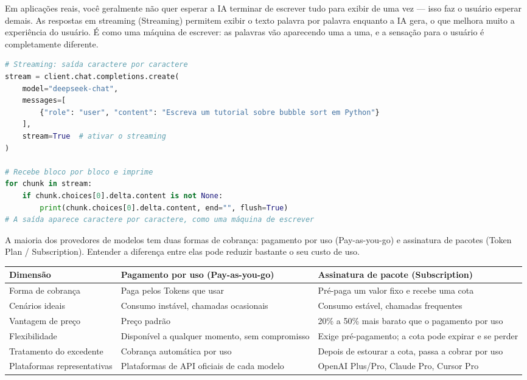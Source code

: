 
Em aplicações reais, você geralmente não quer esperar a IA terminar de escrever tudo para exibir de uma vez — isso faz o usuário esperar demais. As respostas em streaming (Streaming) permitem exibir o texto palavra por palavra enquanto a IA gera, o que melhora muito a experiência do usuário. É como uma máquina de escrever: as palavras vão aparecendo uma a uma, e a sensação para o usuário é completamente diferente.

\begin{lstlisting}[language=Python]
# Streaming: saída caractere por caractere
stream = client.chat.completions.create(
    model="deepseek-chat",
    messages=[
        {"role": "user", "content": "Escreva um tutorial sobre bubble sort em Python"}
    ],
    stream=True  # ativar o streaming
)

# Recebe bloco por bloco e imprime
for chunk in stream:
    if chunk.choices[0].delta.content is not None:
        print(chunk.choices[0].delta.content, end="", flush=True)
# A saída aparece caractere por caractere, como uma máquina de escrever
\end{lstlisting}


A maioria dos provedores de modelos tem duas formas de cobrança: pagamento por uso (Pay-as-you-go) e assinatura de pacotes (Token Plan / Subscription). Entender a diferença entre elas pode reduzir bastante o seu custo de uso.


\begin{center}
\begin{tabularx}{\linewidth}{|X|X|X|}
\hline
\textbf{Dimensão} & \textbf{Pagamento por uso (Pay-as-you-go)} & \textbf{Assinatura de pacote (Subscription)} \tabularnewline
\hline
Forma de cobrança & Paga pelos Tokens que usar & Pré-paga um valor fixo e recebe uma cota \tabularnewline
Cenários ideais & Consumo instável, chamadas ocasionais & Consumo estável, chamadas frequentes \tabularnewline
Vantagem de preço & Preço padrão & 20\% a 50\% mais barato que o pagamento por uso \tabularnewline
Flexibilidade & Disponível a qualquer momento, sem compromisso & Exige pré-pagamento; a cota pode expirar e se perder \tabularnewline
Tratamento do excedente & Cobrança automática por uso & Depois de estourar a cota, passa a cobrar por uso \tabularnewline
Plataformas representativas & Plataformas de API oficiais de cada modelo & OpenAI Plus/Pro, Claude Pro, Cursor Pro \tabularnewline
\hline
\end{tabularx}
\end{center}

